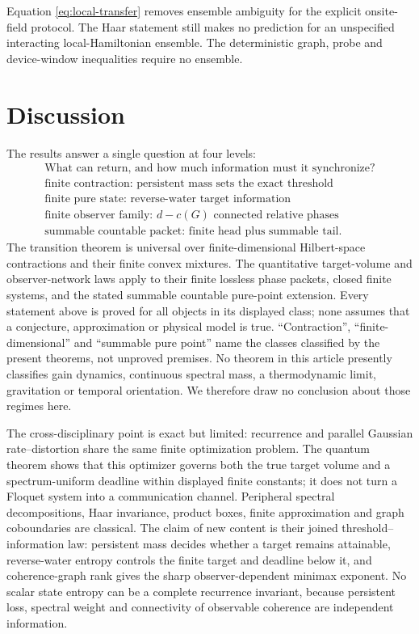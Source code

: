 \documentclass[10pt]{article}
\theoremstyle{definition}
\begin{document}
Equation \eqref{eq:local-transfer} removes ensemble ambiguity for the explicit
onsite-field protocol.  The Haar statement still makes no prediction for an
unspecified interacting local-Hamiltonian ensemble.  The deterministic graph,
probe and device-window inequalities require no ensemble.

\section*{Discussion}

The results answer a single question at four levels:
\[
\begin{array}{c}
\text{What can return, and how much information must it synchronize?}\\[2mm]
\text{finite contraction: persistent mass sets the exact threshold}\\
\text{finite pure state: reverse-water target information}\\
\text{finite observer family: }d-c(G)\text{ connected relative phases}\\
\text{summable countable packet: finite head plus summable tail}.
\end{array}
\]
The transition theorem is universal over finite-dimensional Hilbert-space
contractions and their finite convex mixtures.  The quantitative
target-volume and observer-network laws apply to their finite lossless phase
packets, closed finite systems, and the stated summable countable pure-point
extension.  Every statement above is proved for all objects in its displayed
class; none assumes that a conjecture, approximation or physical model is
true.  ``Contraction'', ``finite-dimensional'' and ``summable pure point''
name the classes classified by the present theorems, not unproved premises.
No theorem in this article presently classifies gain dynamics, continuous
spectral mass, a thermodynamic limit, gravitation or temporal orientation.
We therefore draw no conclusion about those regimes here.

The cross-disciplinary point is exact but limited: recurrence and parallel
Gaussian rate--distortion share the same finite optimization problem.  The
quantum theorem shows that this optimizer governs both the true target volume
and a spectrum-uniform deadline within displayed finite constants; it does
not turn a Floquet system into a
communication channel.  Peripheral spectral decompositions, Haar invariance,
product boxes, finite approximation and graph coboundaries are classical.
The claim of new content is their joined threshold--information law:
persistent mass decides whether a target remains attainable, reverse-water
entropy controls the finite target and deadline below it, and coherence-graph
rank gives the sharp observer-dependent minimax exponent.  No scalar state
entropy can be a complete recurrence invariant, because persistent loss,
spectral weight and connectivity of observable coherence are independent
information.
\end{document}
